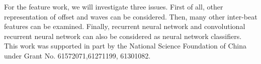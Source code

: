 \documentclass[wcp]{jmlr}
\begin{document}
For the feature work, we will investigate three issues. First of all, other representation of offset and waves can be considered. Then, many other inter-beat features can be examined. Finally, recurrent neural network and convolutional recurrent neural network can also be considered as neural network classifiers.
\acks{}
This work was supported in part by the National Science Foundation of China under Grant No. 61572071,61271199, 61301082.

\end{document}
